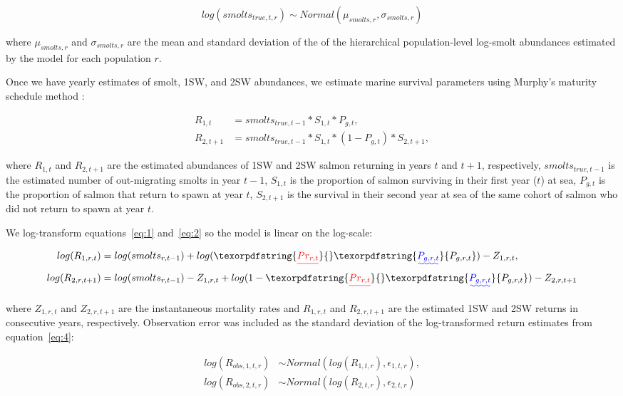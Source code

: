 \documentclass[12pt]{article}
\providecommand{\DIFaddtex}[1]{{\protect\color{blue}\uwave{#1}}} %
\providecommand{\DIFdeltex}[1]{{\protect\color{red}\sout{#1}}}                      %
\providecommand{\DIFaddbegin}{} %
\providecommand{\DIFaddend}{} %
\providecommand{\DIFdelbegin}{} %
\providecommand{\DIFdelend}{} %
\providecommand{\DIFadd}[1]{\texorpdfstring{\DIFaddtex{#1}}{#1}} %
\providecommand{\DIFdel}[1]{\texorpdfstring{\DIFdeltex{#1}}{}} %
\begin{document}
\begin{equation}
log(smolts_{true,t,r}) \sim Normal(\mu_{smolts,r}, \sigma_{smolts,r})
\end{equation}

where $\mu_{smolts,r}$ and $\sigma_{smolts,r}$ are the mean and standard
deviation of the of the hierarchical population-level log-smolt abundances
estimated by the model for each population $r$.

Once we have yearly estimates of smolt, 1SW, and 2SW abundances, we estimate
marine survival parameters using Murphy's maturity schedule method
\citep{Murphy1952, Ricker1975}:

\begin{align}
    R_{1,t} &= smolts_{true,t-1} * S_{1,t} * P_{g,t} \label{eq:1}, \\
    R_{2,t+1} &= smolts_{true,t-1} * S_{1,t} * (1 - P_{g,t}) * S_{2,t+1}, \label{eq:2}
\end{align}

where $R_{1,t}$ and $R_{2,t+1}$ are the estimated abundances of 1SW and 2SW
salmon returning in years $t$ and $t+1$, respectively, $smolts_{true,t-1}$ is the
estimated number of out-migrating smolts in year $t-1$, $S_{1,t}$ is the proportion of
salmon surviving in their first year ($t$) at sea, $P_{g,t}$ is the proportion of
salmon that return to spawn at year $t$, $S_{2,t+1}$ is the survival in their
second year at sea of the same cohort of salmon who did not return to spawn at
year $t$.

We log-transform equations~\ref{eq:1} and~\ref{eq:2} so the model
is linear on the log-scale:

\begin{align}
    log(R_{1,r,t}) &= log(smolts_{r,t-1}) + log(\DIFdelbegin \DIFdel{Pr_{r,t}}\DIFdelend \DIFaddbegin \DIFadd{P_{g,r,t}}\DIFaddend ) - Z_{1,r,t} \label{eq:3}, \\
    log(R_{2,r,t+1}) &= log(smolts_{r,t-1}) - Z_{1,r,t} + log(1 - \DIFdelbegin \DIFdel{Pr_{r,t}}\DIFdelend \DIFaddbegin \DIFadd{P_{g,r,t}}\DIFaddend )  - Z_{2,r,t+1} \label{eq:4}
\end{align}

where $Z_{1,r,t}$ and $Z_{2,r,t+1}$ are the instantaneous mortality rates and
$R_{1,r,t}$ and $R_{2,r,t+1}$ are the estimated 1SW and 2SW returns in
consecutive years, respectively. Observation error was included as the
standard deviation of the log-transformed return estimates from
equation~\ref{eq:4}:

\begin{align}
log(R_{obs,1,t,r}) &\sim Normal(log(R_{1,t,r}), \epsilon_{1,t,r}), \\
log(R_{obs,2,t,r}) &\sim Normal(log(R_{2,t,r}), \epsilon_{2,t,r}) \label{eq:5}
\end{align}
\end{document}
